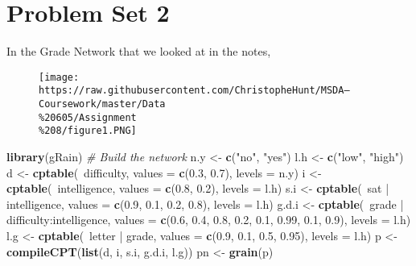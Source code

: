 \documentclass[]{article}
\newenvironment{Shaded}{\begin{snugshade}}{\end{snugshade}}
\newcommand{\KeywordTok}[1]{\textcolor[rgb]{0.13,0.29,0.53}{\textbf{{#1}}}}
\newcommand{\DataTypeTok}[1]{\textcolor[rgb]{0.13,0.29,0.53}{{#1}}}
\newcommand{\FloatTok}[1]{\textcolor[rgb]{0.00,0.00,0.81}{{#1}}}
\newcommand{\StringTok}[1]{\textcolor[rgb]{0.31,0.60,0.02}{{#1}}}
\newcommand{\CommentTok}[1]{\textcolor[rgb]{0.56,0.35,0.01}{\textit{{#1}}}}
\newcommand{\NormalTok}[1]{{#1}}
\begin{document}
\section{Problem Set 2}\label{problem-set-2}

In the Grade Network that we looked at in the notes,

\begin{figure}[htbp]
\centering
\texttt{[image: https://raw.githubusercontent.com/ChristopheHunt/MSDA---Coursework/master/Data\\\%20605/Assignment\\\%208/figure1.PNG]}
\caption{}
\end{figure}

\begin{Shaded}
\begin{Highlighting}[]
\KeywordTok{library}\NormalTok{(gRain)}
\CommentTok{# Build the network}
\NormalTok{n.y <-}\StringTok{ }\KeywordTok{c}\NormalTok{(}\StringTok{"no"}\NormalTok{, }\StringTok{"yes"}\NormalTok{)}
\NormalTok{l.h <-}\StringTok{ }\KeywordTok{c}\NormalTok{(}\StringTok{"low"}\NormalTok{, }\StringTok{"high"}\NormalTok{)}
\NormalTok{d <-}\StringTok{ }\KeywordTok{cptable}\NormalTok{(~difficulty, }\DataTypeTok{values =} \KeywordTok{c}\NormalTok{(}\FloatTok{0.3}\NormalTok{, }\FloatTok{0.7}\NormalTok{), }\DataTypeTok{levels =} \NormalTok{n.y)}
\NormalTok{i <-}\StringTok{ }\KeywordTok{cptable}\NormalTok{(~intelligence, }\DataTypeTok{values =} \KeywordTok{c}\NormalTok{(}\FloatTok{0.8}\NormalTok{, }\FloatTok{0.2}\NormalTok{), }\DataTypeTok{levels =} \NormalTok{l.h)}
\NormalTok{s.i <-}\StringTok{ }\KeywordTok{cptable}\NormalTok{(~sat |}\StringTok{ }\NormalTok{intelligence, }\DataTypeTok{values =} \KeywordTok{c}\NormalTok{(}\FloatTok{0.9}\NormalTok{, }\FloatTok{0.1}\NormalTok{, }\FloatTok{0.2}\NormalTok{, }\FloatTok{0.8}\NormalTok{), }\DataTypeTok{levels =} \NormalTok{l.h)}
\NormalTok{g.d.i <-}\StringTok{ }\KeywordTok{cptable}\NormalTok{(~grade |}\StringTok{ }\NormalTok{difficulty:intelligence, }\DataTypeTok{values =} \KeywordTok{c}\NormalTok{(}\FloatTok{0.6}\NormalTok{, }\FloatTok{0.4}\NormalTok{, }\FloatTok{0.8}\NormalTok{, }
    \FloatTok{0.2}\NormalTok{, }\FloatTok{0.1}\NormalTok{, }\FloatTok{0.99}\NormalTok{, }\FloatTok{0.1}\NormalTok{, }\FloatTok{0.9}\NormalTok{), }\DataTypeTok{levels =} \NormalTok{l.h)}
\NormalTok{l.g <-}\StringTok{ }\KeywordTok{cptable}\NormalTok{(~letter |}\StringTok{ }\NormalTok{grade, }\DataTypeTok{values =} \KeywordTok{c}\NormalTok{(}\FloatTok{0.9}\NormalTok{, }\FloatTok{0.1}\NormalTok{, }\FloatTok{0.5}\NormalTok{, }\FloatTok{0.95}\NormalTok{), }\DataTypeTok{levels =} \NormalTok{l.h)}
\NormalTok{p <-}\StringTok{ }\KeywordTok{compileCPT}\NormalTok{(}\KeywordTok{list}\NormalTok{(d, i, s.i, g.d.i, l.g))}
\NormalTok{pn <-}\StringTok{ }\KeywordTok{grain}\NormalTok{(p)}
\end{Highlighting}
\end{Shaded}
\end{document}
